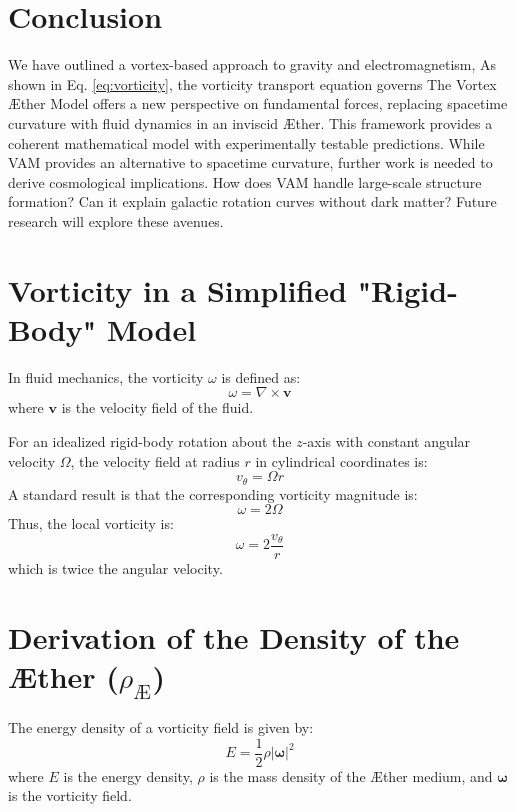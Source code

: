 \documentclass[a4paper,10pt]{article}
\begin{document}
    \section{Conclusion}\label{sec:conclusion}
    We have outlined a vortex-based approach to gravity and electromagnetism, As shown in Eq. \eqref{eq:vorticity}, the vorticity transport equation governs  The Vortex \AE ther Model offers a new perspective on fundamental forces,
    replacing spacetime curvature with fluid dynamics in an inviscid \AE ther.
    This framework provides a coherent mathematical model with experimentally testable predictions.
    While VAM provides an alternative to spacetime curvature, further work is needed to derive cosmological implications.
    How does VAM handle large-scale structure formation?
    Can it explain galactic rotation curves without dark matter?
    Future research will explore these avenues.







        \section{Vorticity in a Simplified "Rigid-Body" Model}\label{sec:vorticity-in-a-simplified-"rigid-body"-model}

        In fluid mechanics, the vorticity $\omega$ is defined as:
        \[ \omega = \nabla \times \mathbf{v} \]
        where $\mathbf{v}$ is the velocity field of the fluid.

        For an idealized rigid-body rotation about the $z$-axis with constant angular velocity $\Omega$, the velocity field at radius $r$ in cylindrical coordinates is:
        \[ v_{\theta} = \Omega r \]
        A standard result is that the corresponding vorticity magnitude is:
        \[ \omega = 2 \Omega \]
        Thus, the local vorticity is:
        \[ \omega = 2 \frac{v_{\theta}}{r} \]
        which is twice the angular velocity.


        \section{Derivation of the Density of the \AE ther ($\rho_\text{\AE}$)}\label{sec:derivation-of-the-density-of-the-ae{}ther-($rho_text{ae}$)}

        The energy density of a vorticity field is given by:
        \[ E = \frac{1}{2} \rho |\mathbf{\omega}|^2 \]
        where $E$ is the energy density, $\rho$ is the mass density of the \AE{}ther medium, and $\mathbf{\omega}$ is the vorticity field.
\end{document}
